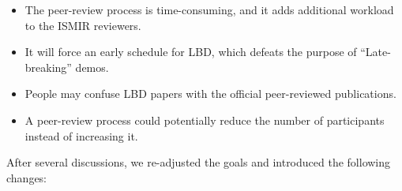 \documentclass[%
10pt,								%
]
{scrartcl}
\begin{document}
            \begin{itemize}
                \item   The peer-review process is time-consuming, and it adds additional workload to the ISMIR reviewers.
                \item   It will force an early schedule for LBD, which defeats the purpose of “Late-breaking” demos. 
                \item   People may confuse LBD papers with the official peer-reviewed publications.
                \item   A peer-review process could potentially reduce the number of participants instead of increasing it.
            \end{itemize}
            
            After several discussions, we re-adjusted the goals and introduced the following changes:
\end{document}

